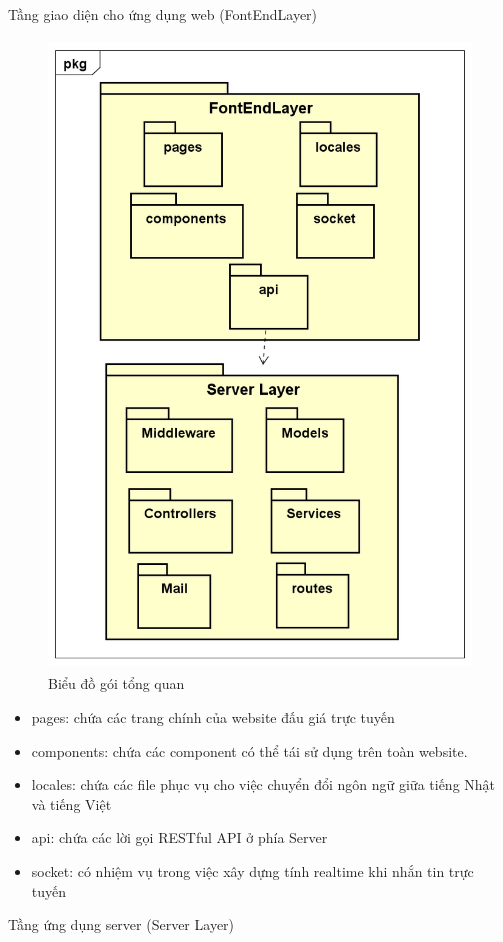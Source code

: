 \documentclass[../DoAn.tex]{subfiles}
\begin{document}
Tầng giao diện cho ứng dụng web (FontEndLayer)
\begin{figure}[H]
    \centering
    \includegraphics[width=11.4cm,height=16.7cm]{Hinhve/thiet_ke_tong_quan.png}
    \caption{Biểu đồ gói tổng quan}
    \label{fig:Fig43}
\end{figure}
\begin{itemize}
    \item pages: chứa các trang chính của website đấu giá trực tuyến
    \item components: chứa các component có thể tái sử dụng trên toàn website.
    \item locales: chứa các file phục vụ cho việc chuyển đổi ngôn ngữ giữa tiếng Nhật và tiếng Việt
    \item api: chứa các lời gọi RESTful API ở phía Server
    \item socket: có nhiệm vụ trong việc xây dựng tính realtime khi nhắn tin trực tuyến
\end{itemize}
Tầng ứng dụng server (Server Layer)
\end{document}
